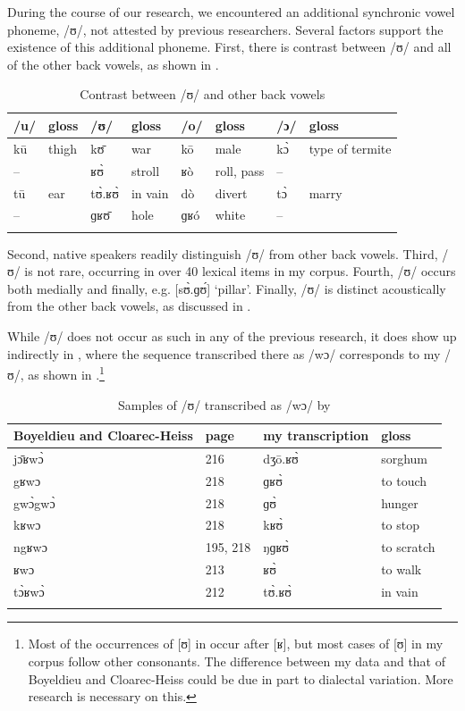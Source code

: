 \documentclass[output=paper,colorlinks,citecolor=brown]{langscibook}
\begin{document}
During the course of our research, we encountered an additional synchronic vowel phoneme, /ʊ/, not attested by previous researchers. Several factors support the existence of this additional phoneme. First, there is contrast between /ʊ/ and all of the other back vowels, as shown in .

\begin{table}
\caption{Contrast between /ʊ/ and other back vowels}
\label{tab:olson:8}
    \begin{tabular}{llllllll}
    \lsptoprule
        /u/     & gloss & /ʊ/ & gloss & /o/ & gloss & /ɔ/ & gloss\\
    \midrule
        kū      & thigh & kʊ̄ & war & kō & male & kɔ̀ & type of termite\\
        --     & & ʁʊ̀ & stroll & ʁò & roll, pass & -- & \\
        tū      & ear & tʊ̀.ʁʊ̀ & in vain & dò & divert & tɔ̀ & marry\\
        --     & & ɡʁʊ̄ & hole & ɡʁó & white & -- & \\
    \lspbottomrule
    \end{tabular}
\end{table}

Second, native speakers readily distinguish /ʊ/ from other back vowels. Third, /ʊ/ is not rare, occurring in over 40 lexical items in my corpus. Fourth, /ʊ/ occurs both medially and finally, e.g. [sʊ̀.ɡʊ́] ‘pillar’. Finally, /ʊ/ is distinct acoustically from the other back vowels, as discussed in .

While /ʊ/ does not occur as such in any of the previous research, it does show up indirectly in \citet{BoyeldieuCloarec-Heiss2001}, where the sequence transcribed there as /wɔ/ corresponds to my /ʊ/, as shown in .\footnote{Most of the occurrences of [ʊ] in  occur after [ʁ], but most cases of [ʊ] in my corpus follow other consonants. The difference between my data and that of Boyeldieu and Cloarec-Heiss could be due in part to dialectal variation. More research is necessary on this.}

\begin{table}
\caption{Samples of /ʊ/ transcribed as /wɔ/ by \citet{BoyeldieuCloarec-Heiss2001}}
\label{tab:olson:9}
    \begin{tabular}{llll}
    \lsptoprule
        Boyeldieu and Cloarec-Heiss & page & my transcription & gloss\\
    \midrule
        jɔ̄ʁwɔ̀ & 216 & dʒō.ʁʊ̀ & sorghum\\
        gʁwɔ & 218 & ɡʁʊ̀ & to touch\\
        gwɔ̀gwɔ̀ & 218 & ɡʊ̀ & hunger\\
        kʁwɔ & 218 & kʁʊ̀ & to stop\\
        ngʁwɔ & 195, 218 & ŋɡʁʊ̀ & to scratch\\
        ʁwɔ & 213 & ʁʊ̀ & to walk\\
        tɔ̀ʁwɔ̀ & 212 & tʊ̀.ʁʊ̀ & in vain\\
    \lspbottomrule
    \end{tabular}
\end{table}
\end{document}
